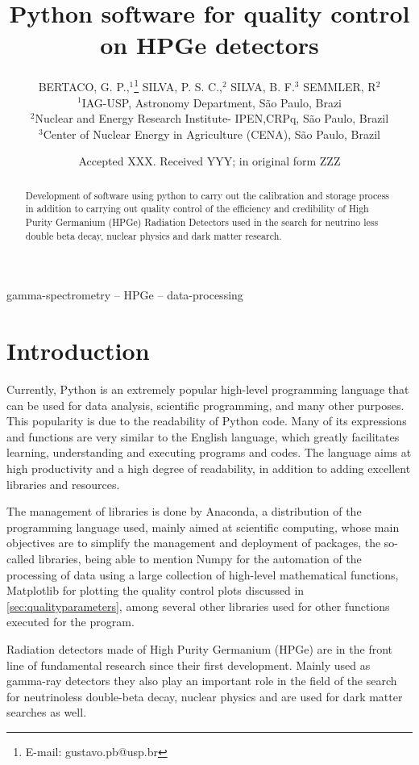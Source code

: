 \documentclass[fleqn,usenatbib]{rasti}
\title[Python software for quality control on HPGe detectors]{Python software for quality control on HPGe detectors}
\author[Bertaco, G. P. et al.]{
BERTACO, G. P.,$^{1}$\thanks{E-mail: gustavo.pb@usp.br}
 SILVA, P. S. C.,$^{2}$
SILVA, B. F.$^{3}$
SEMMLER, R$^{2}$
\\
$^{1}$IAG-USP, Astronomy Department, São Paulo, Brazi\\
$^{2}$Nuclear and Energy Research Institute- IPEN,CRPq, São Paulo, Brazil\\
$^{3}$Center of Nuclear Energy in Agriculture (CENA), São Paulo, Brazil
}
\date{Accepted XXX. Received YYY; in original form ZZZ}
\begin{document}
\label{firstpage}
\pagerange{\pageref{firstpage}--\pageref{lastpage}}
\maketitle

\begin{abstract}
Development of software using python to carry out the calibration and storage process in addition to carrying out quality control of the efficiency and credibility of High Purity Germanium (HPGe) Radiation Detectors used in the search for neutrino less double beta decay, nuclear physics and dark matter research.
\end{abstract}

\begin{keywords}
gamma-spectrometry -- HPGe -- data-processing
\end{keywords}



\section{Introduction}
\label{introduction}
Currently, Python is an extremely popular high-level programming language that can be used for data analysis, scientific programming, and many other purposes. This popularity is due to the readability of Python code. Many of its expressions and functions are very similar to the English language, which greatly facilitates learning, understanding and executing programs and codes. The language aims at high productivity and a high degree of readability, in addition to adding excellent libraries and resources.

The management of libraries is done by Anaconda, a distribution of the programming language used, mainly aimed at scientific computing, whose main objectives are to simplify the management and deployment of packages, the so-called libraries, being able to mention Numpy for the automation of the processing of data using a large collection of high-level mathematical functions, Matplotlib for plotting the quality control plots discussed in \ref{sec:qualityparameters}, among several other libraries used for other functions executed for the program.

Radiation detectors made of High Purity Germanium (HPGe) are in the front line of fundamental research since their first development. Mainly used as gamma-ray detectors they also play an important role in the field of the search for neutrinoless double-beta decay, nuclear physics and are used for dark matter searches as well\citep{abrosimov2020technology}.
\end{document}

